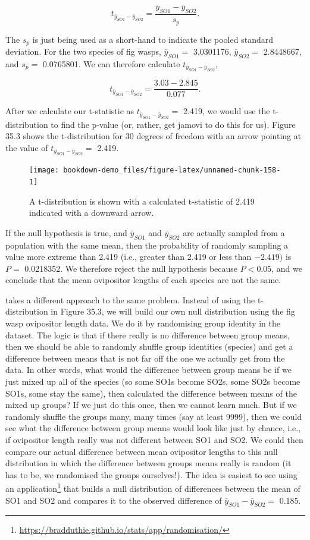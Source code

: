 \documentclass[
  openany]{krantz}
\begin{document}
\[t_{\bar{y}_{SO1} - \bar{y}_{SO2}} = \frac{\bar{y}_{SO1} - \bar{y}_{SO2}}{s_{p}}.\]

The \(s_{p}\) is just being used as a short-hand to indicate the pooled standard deviation.
For the two species of fig wasps, \(\bar{y}_{SO1} =\) 3.0301176, \(\bar{y}_{SO2} =\) 2.8448667, and \(s_{p} =\) 0.0765801.
We can therefore calculate \(t_{\bar{y}_{SO1} - \bar{y}_{SO2}}\),

\[t_{\bar{y}_{SO1} - \bar{y}_{SO2}} = \frac{3.03 - 2.845}{0.077}.\]

After we calculate our t-statistic as \(t_{\bar{y}_{SO1} - \bar{y}_{SO2}} =\) 2.419, we would use the t-distribution to find the p-value (or, rather, get jamovi to do this for us).
Figure 35.3 shows the t-distribution for 30 degrees of freedom with an arrow pointing at the value of \(t_{\bar{y}_{SO1} - \bar{y}_{SO2}} =\) 2.419.

\begin{figure}
\texttt{[image: bookdown-demo\_files/figure-latex/unnamed-chunk-158-1]} \caption{A t-distribution is shown with a calculated t-statistic of 2.419 indicated with a downward arrow.}\label{fig:unnamed-chunk-158}
\end{figure}

If the null hypothesis is true, and \(\bar{y}_{SO1}\) and \(\bar{y}_{SO2}\) are actually sampled from a population with the same mean, then the probability of randomly sampling a value more extreme than 2.419 (i.e., greater than 2.419 or less than \(-2.419)\) is \(P =\) 0.0218352.
We therefore reject the null hypothesis because \(P < 0.05\), and we conclude that the mean ovipositor lengths of each species are not the same.

 takes a different approach to the same problem.
Instead of using the t-distribution in Figure 35.3, we will build our own null distribution using the fig wasp ovipositor length data.
We do it by randomising group identity in the dataset.
The logic is that if there really is no difference between group means, then we should be able to randomly shuffle group identities (species) and get a difference between means that is not far off the one we actually get from the data.
In other words, what would the difference between group means be if we just mixed up all of the species (so some SO1s become SO2s, some SO2s become SO1s, some stay the same), then calculated the difference between means of the mixed up groups?
If we just do this once, then we cannot learn much.
But if we randomly shuffle the groups many, many times (say at least 9999), then we could see what the difference between group means would look like just by chance, i.e., if ovipositor length really was not different between SO1 and SO2.
We could then compare our actual difference between mean ovipositor lengths to this null distribution in which the difference between groups means really is random (it has to be, we randomised the groups ourselves!).
The idea is easiest to see using an  application\footnote{\url{https://bradduthie.github.io/stats/app/randomisation/}} that builds a null distribution of differences between the mean of SO1 and SO2 and compares it to the observed difference of \(\bar{y}_{SO1} - \bar{y}_{SO2} =\) 0.185.
\end{document}
